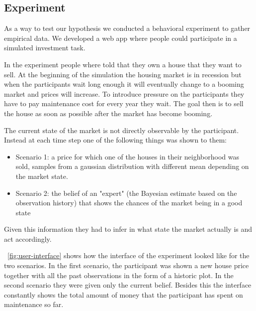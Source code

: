 \subsection{Experiment}

As a way to test our hypothesis we conducted a behavioral experiment to gather empirical data. We developed a web app where people could participate in a simulated investment task.

In the experiment people where told that they own a house that they want to sell. At the beginning of the simulation the housing market is in recession but when the participants wait long enough it will eventually change to a booming market and prices will increase. To introduce pressure on the participants they have to pay maintenance cost for every year they wait.
The goal then is to sell the house as soon as possible after the market has become booming.

The current state of the market is not directly observable by the participant. Instead at each time step one of the following things was shown to them:
\begin{itemize}
    \item Scenario 1: a price for which one of the houses in their neighborhood was sold, samples from a gaussian distribution with different mean depending on the market state.
    \item Scenario 2: the belief of an "expert" (the Bayesian estimate based on the observation history) that shows the chances of the market being in a good state
\end{itemize}

Given this information they had to infer in what state the market actually is and act accordingly.

~\autoref{fig:user-interface} shows how the interface of the experiment looked like for the two scenarios. In the first scenario, the participant was shown a new house price together with all the past observations in the form of a historic plot. In the second scenario they were given only the current belief. Besides this the interface constantly shows the total amount of money that the participant has spent on maintenance so far.

